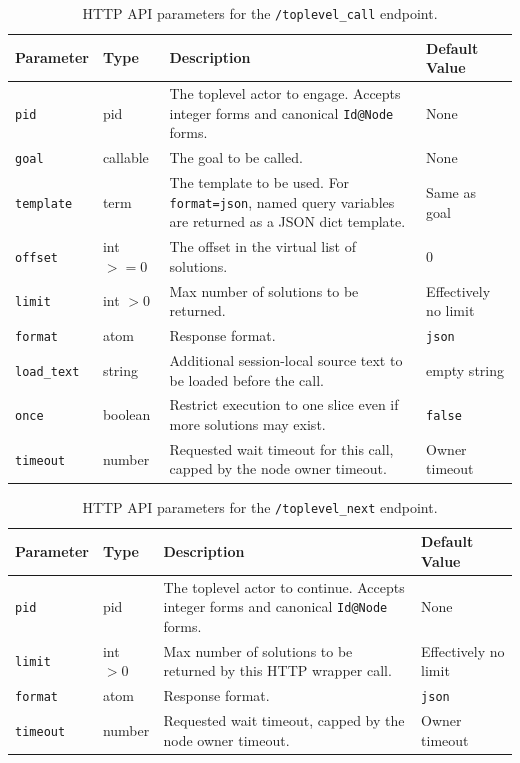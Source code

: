 \begin{table}[h!]
\centering
\begin{tabular}{| m{1.6cm} | m{1.4cm} | m{5.6cm} | m{2.7cm} |}
\hline
\textbf{Parameter} & \textbf{Type} & \textbf{Description} & \textbf{Default Value} \\
\hline
\texttt{pid} & pid & The toplevel actor to engage. Accepts integer forms and canonical \texttt{Id@Node} forms. & None \\
\hline
\texttt{goal} & callable & The goal to be called. & None \\
\hline
\texttt{template} & term & The template to be used. For \texttt{format=json}, named query variables are returned as a JSON dict template. & Same as goal \\
\hline
\texttt{offset} & int $>= 0$ & The offset in the virtual list of solutions. & 0 \\
\hline
\texttt{limit} & int $> 0$ & Max number of solutions to be returned. & Effectively no limit \\
\hline
\texttt{format} & atom & Response format. & \texttt{json} \\
\hline
\texttt{load\_text} & string & Additional session-local source text to be loaded before the call. & empty string \\
\hline
\texttt{once} & boolean & Restrict execution to one slice even if more solutions may exist. & \texttt{false} \\
\hline
\texttt{timeout} & number & Requested wait timeout for this call, capped by the node owner timeout. & Owner timeout \\
\hline
\end{tabular}
\caption{HTTP API parameters for the \texttt{/toplevel\_call} endpoint.}
\label{table:api-parameters-toplevel-call}
\end{table}

\begin{table}[h!]
\centering
\begin{tabular}{| m{1.6cm} | m{1.4cm} | m{5.6cm} | m{2.7cm} |}
\hline
\textbf{Parameter} & \textbf{Type} & \textbf{Description} & \textbf{Default Value} \\
\hline
\texttt{pid} & pid & The toplevel actor to continue. Accepts integer forms and canonical \texttt{Id@Node} forms. & None \\
\hline
\texttt{limit} & int $> 0$ & Max number of solutions to be returned by this HTTP wrapper call. & Effectively no limit \\
\hline
\texttt{format} & atom & Response format. & \texttt{json} \\
\hline
\texttt{timeout} & number & Requested wait timeout, capped by the node owner timeout. & Owner timeout \\
\hline
\end{tabular}
\caption{HTTP API parameters for the \texttt{/toplevel\_next} endpoint.}
\label{table:api-parameters-toplevel-next}
\end{table}


